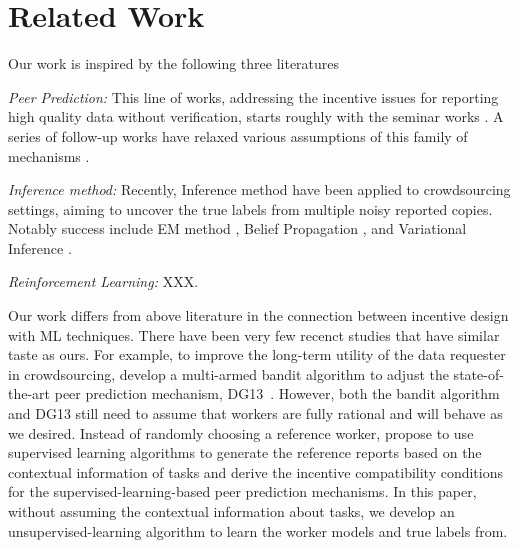 \section{Related Work}
Our work is inspired by the following three literatures 

\emph{Peer Prediction:} This line of works, addressing the incentive issues for reporting high quality data without verification, starts roughly with the seminar works \cite{prelec2004bayesian,gneiting2007strictly}. A series of follow-up works have relaxed various assumptions of this family of mechanisms \cite{jurca2009mechanisms,witkowski2012peer,radanovic2013robust,dasgupta2013crowdsourced}. 

\emph{Inference method:} Recently, Inference method have been applied to crowdsourcing settings, aiming to uncover the true labels from multiple noisy reported copies. Notably success include EM method \cite{}, Belief Propagation \cite{}, and Variational Inference \cite{}.

\emph{Reinforcement Learning:} XXX. 

Our work differs from above literature in the connection between incentive design with ML techniques. There have been very few recenct studies that have similar taste as ours.
For example, to improve the long-term utility of the data requester in crowdsourcing, \citet{liu2017sequential} develop a multi-armed bandit algorithm to adjust the state-of-the-art peer prediction mechanism, DG13~\cite{dasgupta2013crowdsourced}.
However, both the bandit algorithm and DG13 still need to assume that workers are fully rational and will behave as we desired.
Instead of randomly choosing a reference worker, \citet{liu2017machine} propose to use supervised learning algorithms to generate the reference reports based on the contextual information of tasks and derive the incentive compatibility conditions for the supervised-learning-based peer prediction mechanisms.
In this paper, without assuming the contextual information about tasks, we develop an unsupervised-learning algorithm to learn the worker models and true labels from.



